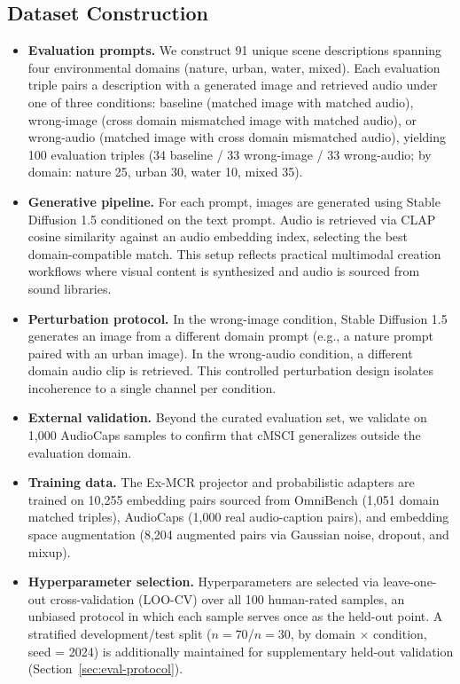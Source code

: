 \documentclass[a4paper,fleqn]{cas-sc}
\begin{document}
\subsection{Dataset Construction}
\begin{itemize}


\item \textbf{Evaluation prompts.} We construct 91 unique scene descriptions spanning four environmental domains (nature, urban, water, mixed). Each evaluation triple pairs a description with a generated image and retrieved audio under one of three conditions: baseline (matched image with matched audio), wrong-image (cross domain mismatched image with matched audio), or wrong-audio (matched image with cross domain mismatched audio), yielding 100 evaluation triples (34 baseline / 33 wrong-image / 33 wrong-audio; by domain: nature 25, urban 30, water 10, mixed 35).



\item \textbf{Generative pipeline.} For each prompt, images are generated using  Stable Diffusion 1.5 \citep{rombach2022high} conditioned on the text prompt. Audio is retrieved via CLAP cosine similarity against an audio embedding index, selecting the best domain-compatible match. This setup reflects practical multimodal creation workflows where visual content is synthesized and audio is sourced from sound libraries.

\item \textbf{Perturbation protocol.} In the wrong-image condition, Stable Diffusion 1.5 generates an image from a different domain prompt (e.g., a nature prompt paired with an urban image). In the wrong-audio condition, a different domain audio clip is retrieved. This controlled perturbation design isolates incoherence to a single channel per condition.

\item \textbf{External validation.} Beyond the curated evaluation set, we validate on 1{,}000 AudioCaps samples \citep{Kim2019} to confirm that cMSCI generalizes outside the evaluation domain.

\item \textbf{Training data.} The Ex-MCR projector and probabilistic adapters are trained on 10{,}255 embedding pairs sourced from OmniBench (1{,}051 domain matched triples), AudioCaps (1{,}000 real audio-caption pairs), and embedding space augmentation (8{,}204 augmented pairs via Gaussian noise, dropout, and mixup).

\item \textbf{Hyperparameter selection.} Hyperparameters are selected via leave-one-out cross-validation (LOO-CV) over all 100 human-rated samples, an unbiased protocol in which each sample serves once as the held-out point. A stratified development/test split ($n=70$/$n=30$, by domain $\times$ condition, seed = 2024) is additionally maintained for supplementary held-out validation (Section~\ref{sec:eval-protocol}).



\end{itemize}
\end{document}
